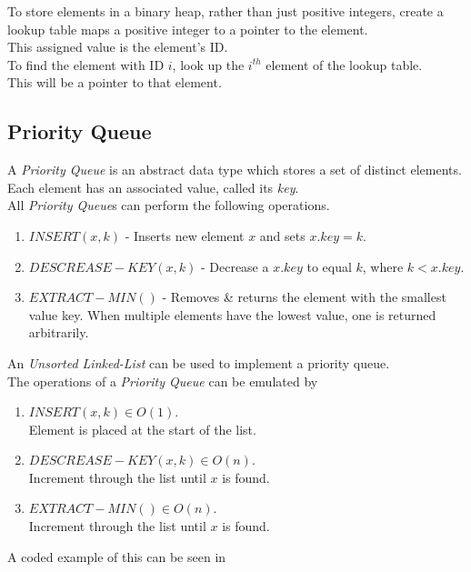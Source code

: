 \documentclass[11pt,a4paper]{article}
\begin{document}
To store elements in a binary heap, rather than just positive integers, create a lookup table maps a positive integer to a pointer to the element.\\
This assigned value is the element's ID.\\
To find the element with ID $i$, look up the $i^{th}$ element of the lookup table.\\
This will be a pointer to that element.


\subsection{Priority Queue}

A \textit{Priority Queue} is an abstract data type which stores a set of distinct elements.\\
Each element has an associated value, called its \textit{key}.\\
All \textit{Priority Queue}s can perform the following operations.
\begin{enumerate}[label=\roman*)]
  \item $INSERT(x,k)$ - Inserts new element $x$ and sets $x.key=k$.
  \item $DESCREASE-KEY(x,k)$ - Decrease a $x.key$ to equal $k$, where $k<x.key$.
  \item $EXTRACT-MIN()$ - Removes \& returns the element with the smallest value key. When multiple elements have the lowest value, one is returned arbitrarily.
\end{enumerate}

\newpage
{}
An \textit{Unsorted Linked-List} can be used to implement a priority queue.\\
The operations of a \textit{Priority Queue} can be emulated by
\begin{enumerate}[label=\roman*)]
  \item $INSERT(x,k)\in O(1)$.\\
  Element is placed at the start of the list.
  \item $DESCREASE-KEY(x,k) \in O(n)$.\\
  Increment through the list until $x$ is found.
  \item $EXTRACT-MIN()\in O(n)$.\\
  Increment through the list until $x$ is found.
\end{enumerate}
\nb A coded example of this can be seen in {}\\
\end{document}
